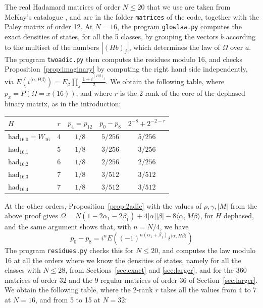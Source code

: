 \documentclass[11pt,a4paper]{article}
\theoremstyle{remark}
\begin{document}
The real Hadamard matrices of order $N\leq20$ that we use are taken from McKay's catalogue \cite{mck}, and are in the folder \texttt{matrices} of the code, together with the Paley matrix of order 12. At $N=16$, the program \texttt{glowlaw.py} computes the exact densities of states, for all the 5 classes, by grouping the vectors $b$ according to the multiset of the numbers $|(Hb)_j|$, which determines the law of $\Omega$ over $a$. The program \texttt{twoadic.py} then computes the residues modulo 16, and checks Proposition~\ref{prop:imaginary} by computing the right hand side independently, via $E(i^{\langle\alpha,H\beta\rangle})=E_\beta\prod_j\frac{1+i^{(H\beta)_j}}{2}$. We obtain the following table, where $p_x=P(\Omega=x(16))$, and where $r$ is the 2-rank of the core of the dephased binary matrix, as in the introduction:

\medskip

\begin{center}
\begin{tabular}{|l|c|c|c|c|}
\hline
$H$ & $r$ & $p_4=p_{12}$ & $p_0-p_8$ & $2^{-8}+2^{-2-r}$\\
\hline
$\mathrm{had}_{16.0}=W_{16}$ & $4$ & $1/8$ & $5/256$ & $5/256$\\
$\mathrm{had}_{16.1}$ & $5$ & $1/8$ & $3/256$ & $3/256$\\
$\mathrm{had}_{16.2}$ & $6$ & $1/8$ & $2/256$ & $2/256$\\
$\mathrm{had}_{16.3}$ & $7$ & $1/8$ & $3/512$ & $3/512$\\
$\mathrm{had}_{16.4}$ & $7$ & $1/8$ & $3/512$ & $3/512$\\
\hline
\end{tabular}
\end{center}

\medskip

At the other orders, Proposition~\ref{prop:2adic} with the values of $\rho,\gamma,|M|$ from the above proof gives $\Omega=N(1-2\alpha_1-2\beta_1)+4|\alpha||\beta|-8\langle\alpha,M\beta\rangle$, for $H$ dephased, and the same argument shows that, with $n=N/4$, we have
\[
 p_0-p_8=i^nE\left((-1)^{n(\alpha_1+\beta_1)}i^{\langle\alpha,H\beta\rangle}\right)
\]
The program \texttt{residues.py} checks this for $N\leq20$, and computes the law modulo 16 at all the orders where we know the densities of states, namely for all the classes with $N\leq28$, from Sections~\ref{sec:exact} and \ref{sec:larger}, and for the 360 matrices of order 32 and the 9 regular matrices of order 36 of Section~\ref{sec:larger}. We obtain the following table, where the 2-rank $r$ takes all the values from 4 to 7 at $N=16$, and from 5 to 15 at $N=32$:
\end{document}
